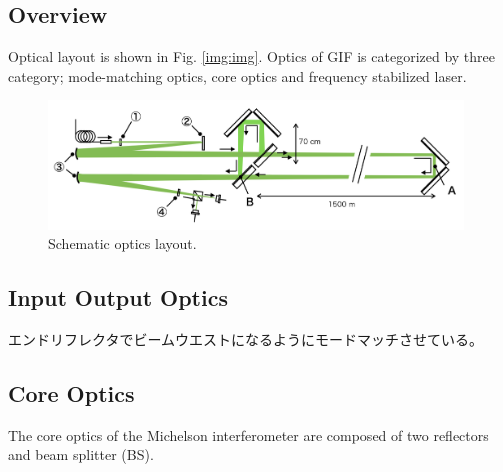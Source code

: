 \subsection{Overview}
Optical layout is shown in Fig. \ref{img:img}. Optics of GIF is categorized by three category; mode-matching optics, core optics and frequency stabilized laser.

\begin{figure}[h]
  \begin{center}   
    \includegraphics[width=11cm]{./img_chap4/img416.png}
    \caption{Schematic optics layout.}\label{img:img416}
  \end{center}
\end{figure}

\subsection{Input Output Optics}
エンドリフレクタでビームウエストになるようにモードマッチさせている。

\subsection{Core Optics}
The core optics of the Michelson interferometer are composed of two reflectors and beam splitter (BS). 

